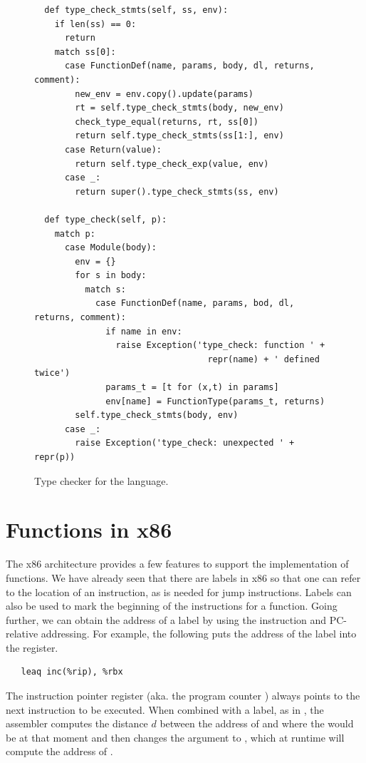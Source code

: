 \documentclass[7x10,nocrop]{TimesAPriori_MIT}%
\begin{document}
\begin{figure}[tp]
{\begin{lstlisting}
  def type_check_stmts(self, ss, env):
    if len(ss) == 0:
      return
    match ss[0]:
      case FunctionDef(name, params, body, dl, returns, comment):
        new_env = env.copy().update(params)
        rt = self.type_check_stmts(body, new_env)
        check_type_equal(returns, rt, ss[0])
        return self.type_check_stmts(ss[1:], env)
      case Return(value):
        return self.type_check_exp(value, env)
      case _:
        return super().type_check_stmts(ss, env)

  def type_check(self, p):
    match p:
      case Module(body):
        env = {}
        for s in body:
          match s:
            case FunctionDef(name, params, bod, dl, returns, comment):
              if name in env:
                raise Exception('type_check: function ' +
                                  repr(name) + ' defined twice')
              params_t = [t for (x,t) in params]
              env[name] = FunctionType(params_t, returns)
        self.type_check_stmts(body, env)
      case _:
        raise Exception('type_check: unexpected ' + repr(p))
\end{lstlisting}
\fi}
\caption{Type checker for the \LangFun{} language.}
\label{fig:type-check-Rfun}
\end{figure}


\clearpage

\section{Functions in x86}
\label{sec:fun-x86}



The x86 architecture provides a few features to support the
implementation of functions. We have already seen that there are
labels in x86 so that one can refer to the location of an instruction, as is
needed for jump instructions. Labels can also be used to mark the
beginning of the instructions for a function.  Going further, we can
obtain the address of a label by using the  instruction and
PC-relative addressing. For example, the following puts the
address of the  label into the  register.
\begin{lstlisting}
   leaq inc(%rip), %rbx
\end{lstlisting}
The instruction pointer register  (aka. the program counter
) always points to the next
instruction to be executed. When combined with a label, as in
, the assembler computes the distance $d$ between the
address of  and where the  would be at that moment
and then changes the  argument to ,
which at runtime will compute the address of .
\end{document}
